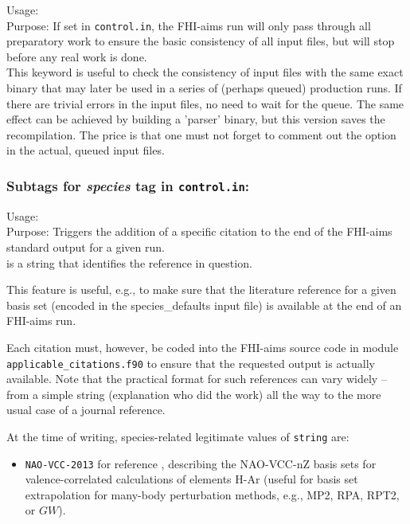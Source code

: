 {
  \noindent
  Usage:  \\[1.0ex]
  Purpose: If set in \texttt{control.in}, the FHI-aims run will only
  pass through all preparatory work to ensure the basic consistency of
  all input files, but will stop before any real work is done.
 \\[1.0ex]
}
%
This keyword is useful to check the consistency of input files with
the same exact binary that may later be used in a series of (perhaps
queued) production runs. If there are trivial errors in the input
files, no need to wait for the queue. The same effect can be achieved
by building a 'parser' binary, but this version saves the
recompilation. The price is that one must not forget to comment out
the  option in the actual, queued input files.

\subsubsection*{Subtags for \emph{species} tag in \texttt{control.in}:}

{
  \noindent
  Usage:   \\[1.0ex]
  Purpose: Triggers the addition of a specific citation to the end
           of the FHI-aims standard output for a given run. \\[1.0ex] 
   is a string that identifies the reference in question. \\
}

This feature is useful, e.g., to make sure that the literature reference for
a given basis set (encoded in the species\_defaults input file) is available
at the end of an FHI-aims run. 

Each citation must, however, be coded into the FHI-aims source code
in module \texttt{applicable\_citations.f90} to ensure that the requested 
output is actually available. Note that the practical format for such references
can vary widely -- from a simple string (explanation who did the work)
all the way to the more usual case of a journal reference.

At the time of writing, species-related legitimate values of \texttt{string} are:
\begin{itemize}
  \item \texttt{NAO-VCC-2013} for reference \cite{Zhang2013},
    describing the NAO-VCC-nZ basis sets for valence-correlated
    calculations of elements H-Ar (useful for basis set extrapolation
    for many-body perturbation methods, e.g., MP2, RPA, RPT2, or
    $GW$). 
\end{itemize}
